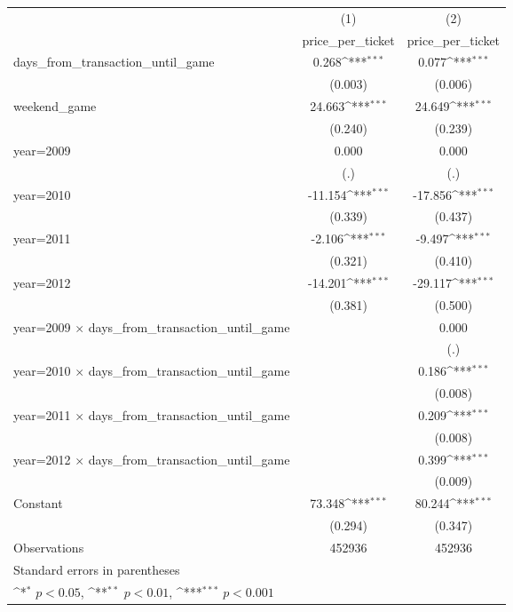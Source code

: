 {
\def\sym#1{\ifmmode^{#1}\else\(^{#1}\)\fi}
\begin{tabular}{l*{2}{c}}
\hline\hline
                    &\multicolumn{1}{c}{(1)}&\multicolumn{1}{c}{(2)}\\
                    &\multicolumn{1}{c}{price\_per\_ticket}&\multicolumn{1}{c}{price\_per\_ticket}\\
\hline
days\_from\_transaction\_until\_game&       0.268\sym{***}&       0.077\sym{***}\\
                    &     (0.003)         &     (0.006)         \\
[1em]
weekend\_game        &      24.663\sym{***}&      24.649\sym{***}\\
                    &     (0.240)         &     (0.239)         \\
[1em]
year=2009           &       0.000         &       0.000         \\
                    &         (.)         &         (.)         \\
[1em]
year=2010           &     -11.154\sym{***}&     -17.856\sym{***}\\
                    &     (0.339)         &     (0.437)         \\
[1em]
year=2011           &      -2.106\sym{***}&      -9.497\sym{***}\\
                    &     (0.321)         &     (0.410)         \\
[1em]
year=2012           &     -14.201\sym{***}&     -29.117\sym{***}\\
                    &     (0.381)         &     (0.500)         \\
[1em]
year=2009 $\times$ days\_from\_transaction\_until\_game&                     &       0.000         \\
                    &                     &         (.)         \\
[1em]
year=2010 $\times$ days\_from\_transaction\_until\_game&                     &       0.186\sym{***}\\
                    &                     &     (0.008)         \\
[1em]
year=2011 $\times$ days\_from\_transaction\_until\_game&                     &       0.209\sym{***}\\
                    &                     &     (0.008)         \\
[1em]
year=2012 $\times$ days\_from\_transaction\_until\_game&                     &       0.399\sym{***}\\
                    &                     &     (0.009)         \\
[1em]
Constant            &      73.348\sym{***}&      80.244\sym{***}\\
                    &     (0.294)         &     (0.347)         \\
\hline
Observations        &      452936         &      452936         \\
\hline\hline
\multicolumn{3}{l}{\footnotesize Standard errors in parentheses}\\
\multicolumn{3}{l}{\footnotesize \sym{*} \(p<0.05\), \sym{**} \(p<0.01\), \sym{***} \(p<0.001\)}\\
\end{tabular}
}
